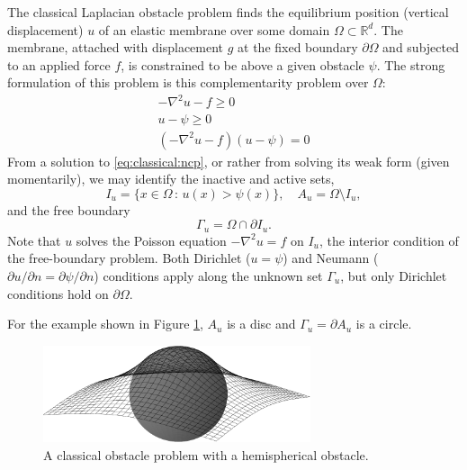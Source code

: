 \documentclass[]{interact}
\theoremstyle{plain}%
\theoremstyle{definition}
\theoremstyle{remark}
\newcommand{\RR}{\mathbb{R}}
\begin{document}
The classical Laplacian obstacle problem \cite{KinderlehrerStampacchia1980} finds the equilibrium position (vertical displacement) $u$ of an elastic membrane over some domain $\Omega \subset \RR^d$.  The membrane, attached with displacement $g$ at the fixed boundary $\partial\Omega$ and subjected to an applied force $f$, is constrained to be above a given obstacle $\psi$.  The strong formulation of this problem is this complementarity problem over $\Omega$:
\begin{subequations} \label{eq:classical:ncp}
\begin{align}
  -\nabla^2 u - f \geq 0 \label{eq:classical:ncp:a} \\
  u - \psi \geq 0\\
  (-\nabla^2u - f)(u - \psi) = 0 \label{eq:classical:ncp:c}
\end{align}
\end{subequations}
From a solution to \eqref{eq:classical:ncp}, or rather from solving its weak form (given momentarily), we may identify the inactive and active sets,
\begin{equation}
  I_u = \{x \in \Omega \,:\, u(x) > \psi(x)\}, \quad A_u = \Omega \setminus I_u, \label{eq:classical:sets}
\end{equation}
and the free boundary
\begin{equation}
\Gamma_u = \Omega \cap \partial I_u. \label{eq:classical:freeboundary}
\end{equation}
Note that $u$ solves the Poisson equation $-\nabla^2u = f$ on $I_u$, the interior condition of the free-boundary problem.  Both Dirichlet ($u=\psi$) and Neumann ($\partial u/\partial n = \partial \psi/\partial n$) conditions apply along the unknown set $\Gamma_u$, but only Dirichlet conditions hold on $\partial\Omega$.

For the example shown in Figure \ref{fig:ball}, $A_u$ is a disc and $\Gamma_u=\partial A_u$ is a circle.

\begin{figure}[H]
\centering
\includegraphics[width=0.7\textwidth]{static/obstacle65.pdf}
\caption{A classical obstacle problem with a hemispherical obstacle.}
\label{fig:ball}
\end{figure}
\end{document}
